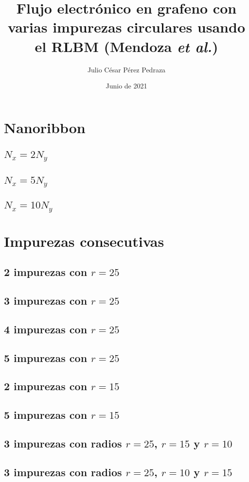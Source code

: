 \documentclass{article}
\title{Flujo electrónico en grafeno con varias impurezas circulares usando el RLBM (Mendoza \textit{et al.})}
\author{Julio César Pérez Pedraza}
\date{Junio de 2021}
\begin{document}
\maketitle

\section{Nanoribbon}
\subsection{$N_x = 2 N_y$}
\subsection{$N_x = 5 N_y$}
\subsection{$N_x = 10 N_y$}

\section{Impurezas consecutivas}
\subsection{2 impurezas con $r=25$}
\subsection{3 impurezas con $r=25$}
\subsection{4 impurezas con $r=25$}
\subsection{5 impurezas con $r=25$}
\subsection{2 impurezas con $r=15$}
\subsection{5 impurezas con $r=15$}
\subsection{3 impurezas con radios $r=25$, $r=15$ y $r=10$}
\subsection{3 impurezas con radios $r=25$, $r=10$ y $r=15$}
\end{document}
